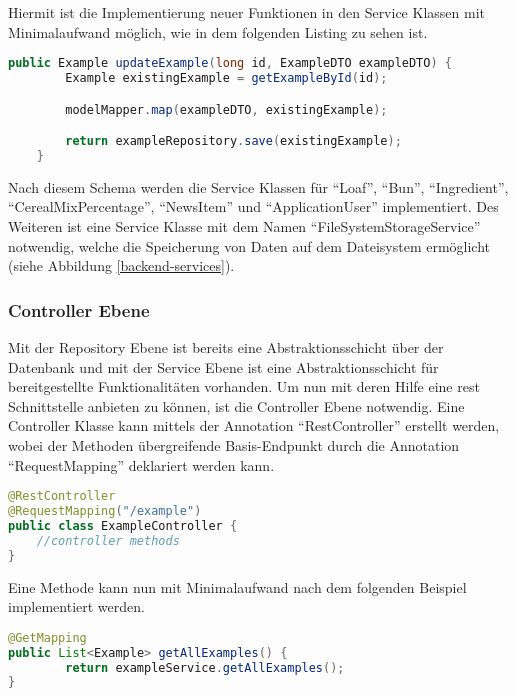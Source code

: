 Hiermit ist die Implementierung neuer Funktionen in den Service Klassen mit Minimalaufwand möglich, wie in dem folgenden Listing zu sehen ist.
\begin{lstlisting}[language=Java]
public Example updateExample(long id, ExampleDTO exampleDTO) {
        Example existingExample = getExampleById(id);

        modelMapper.map(exampleDTO, existingExample);

        return exampleRepository.save(existingExample);
    }
\end{lstlisting}

Nach diesem Schema werden die Service Klassen für \enquote{Loaf}, \enquote{Bun}, \enquote{Ingredient}, \enquote{CerealMixPercentage}, \enquote{NewsItem} und \enquote{ApplicationUser} implementiert. Des Weiteren ist eine Service Klasse mit dem Namen \enquote{FileSystemStorageService} notwendig, welche die Speicherung von Daten auf dem Dateisystem ermöglicht (siehe Abbildung \ref{backend-services}). 

\clearpage


\clearpage

\subsubsection{Controller Ebene}
Mit der Repository Ebene ist bereits eine Abstraktionsschicht über der Datenbank und mit der Service Ebene ist eine Abstraktionsschicht für bereitgestellte Funktionalitäten vorhanden. Um nun mit deren Hilfe eine \gls{rest} Schnittstelle anbieten zu können, ist die Controller Ebene notwendig.
Eine Controller Klasse kann mittels der Annotation \enquote{RestController} erstellt werden, wobei der Methoden übergreifende Basis-Endpunkt durch die Annotation \enquote{RequestMapping} deklariert werden kann.
\begin{lstlisting}[language=Java]
@RestController
@RequestMapping("/example")
public class ExampleController {
	//controller methods
}
\end{lstlisting}

Eine Methode kann nun mit Minimalaufwand nach dem folgenden Beispiel implementiert werden.
\begin{lstlisting}[language=Java]
@GetMapping
public List<Example> getAllExamples() {
        return exampleService.getAllExamples();
}
\end{lstlisting}

